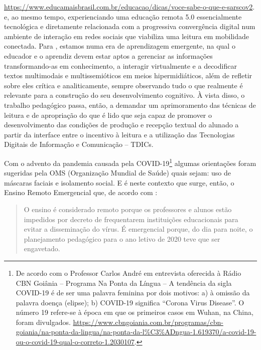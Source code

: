 \documentclass{textolivre}
\begin{document}
{\url{https://www.educamaisbrasil.com.br/educacao/dicas/voce-sabe-o-que-e-sarscov2}.} e, ao mesmo tempo, experienciando uma educação remota 5.0 essencialmente tecnológica e diretamente relacionada com a progressiva convergência digital num ambiente de interação em redes sociais que viabiliza uma leitura em mobilidade conectada. Para \textcite[p. 30]{alexander_2004}, estamos numa era de aprendizagem emergente, na qual o educador e o aprendiz devem estar aptos a gerenciar as informações transformando-as em conhecimento, a interagir virtualmente e a decodificar textos multimodais e multissemióticos em meios hipermidiáticos, além de refletir sobre eles crítica e analiticamente, sempre observando tudo o que realmente é relevante para a construção do seu desenvolvimento cognitivo. À vista disso, o trabalho pedagógico passa, então, a demandar um aprimoramento das técnicas de leitura e de apropriação do que é lido que seja capaz de promover o desenvolvimento das condições de produção e recepção textual do alunado a partir da interface entre o incentivo à leitura e a utilização das Tecnologias Digitais de Informação e Comunicação – TDICs. 

Com o advento da pandemia causada pela COVID-19\footnote{De acordo com o Professor Carlos André em entrevista oferecida à Rádio CBN Goiânia – Programa Na Ponta da Língua – A tendência da sigla COVID-19 é de ser uma palavra feminina por dois motivos: a) à omissão da palavra doença (elipse); b) COVID-19 significa “Corona Virus Disease”. O número 19 refere-se à época em que os primeiros casos em Wuhan, na China, foram divulgados.
\url{https://www.cbngoiania.com.br/programas/cbn-goiania/na-ponta-da-lingua/na-ponta-da-l\%C3\%ADngua-1.619370/a-covid-19-ou-o-covid-19-qual-o-correto-1.2030107}.} algumas orientações foram sugeridas pela OMS (Organização Mundial de Saúde) quais sejam: uso de máscaras faciais e isolamento social. E é neste contexto que surge, então, o Ensino Remoto Emergencial que, de acordo com \textcite[s.p.]{behar_artigo:_2020}:

\begin{quote}
    O ensino é considerado remoto porque os professores e alunos estão impedidos por decreto de frequentarem instituições educacionais para evitar a disseminação do vírus. É emergencial porque, do dia para noite, o planejamento pedagógico para o ano letivo de 2020 teve que ser engavetado.
\end{quote}
\end{document}

